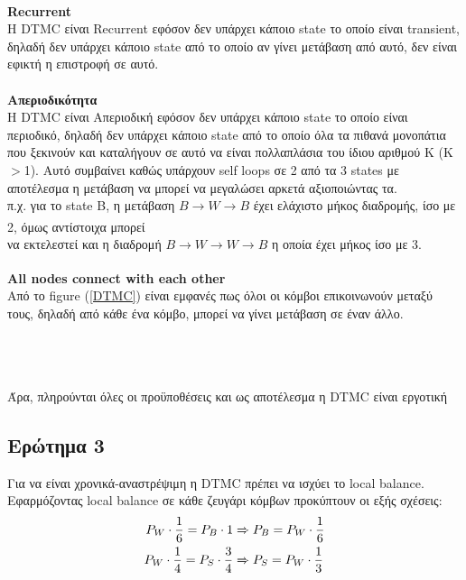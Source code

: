 \noindent\\
\textbf{Recurrent}\\
H DTMC είναι Recurrent εφόσον δεν υπάρχει κάποιο state το οποίο είναι transient, δηλαδή δεν υπάρχει κάποιο state από το οποίο αν γίνει μετάβαση από αυτό, δεν είναι εφικτή η επιστροφή σε αυτό.\\

\noindent\\
\textbf{Απεριοδικότητα}\\
Η DTMC είναι Απεριοδική εφόσον δεν υπάρχει κάποιο state το οποίο είναι περιοδικό, δηλαδή δεν υπάρχει κάποιο state από το οποίο όλα τα πιθανά μονοπάτια που ξεκινούν και καταλήγουν σε αυτό να είναι πολλαπλάσια του ίδιου αριθμού Κ (Κ$>$1). Αυτό συμβαίνει καθώς υπάρχουν self loops σε 2 από τα 3 states με αποτέλεσμα η μετάβαση να μπορεί να μεγαλώσει αρκετά αξιοποιώντας τα.\\

\noindent
π.χ. για το state Β, η μετάβαση $B \xrightarrow[]{} W \xrightarrow[]{} B$ έχει ελάχιστο μήκος διαδρομής, ίσο με 2, όμως αντίστοιχα μπορεί\\ \vspace{1cm} \qquad να εκτελεστεί και η διαδρομή $B \xrightarrow[]{} W \xrightarrow[]{} W \xrightarrow[]{} B$ η οποία έχει μήκος ίσο με 3.

\noindent
\textbf{All nodes connect with each other}\\
Από το figure (\ref{DTMC}) είναι εμφανές πως όλοι οι κόμβοι επικοινωνούν μεταξύ τους, δηλαδή από κάθε ένα κόμβο, μπορεί να γίνει μετάβαση σε έναν άλλο.


\noindent\\\\\\
Άρα, πληρούνται όλες οι προϋποθέσεις και ως αποτέλεσμα η DTMC είναι εργοτική

\clearpage
\subsection*{Ερώτημα 3}
\label{ex2q3}

Για να είναι χρονικά-αναστρέψιμη η DTMC πρέπει να ισχύει το local balance. Εφαρμόζοντας local balance σε κάθε ζευγάρι κόμβων προκύπτουν οι εξής σχέσεις:
\begin{align}
	P_W \cdot \frac{1}{6} = P_B \cdot 1 &\xRightarrow{} P_B = P_W \cdot \frac{1}{6} \label{pbw}\\
	P_W \cdot \frac{1}{4} = P_S \cdot \frac{3}{4} &\xRightarrow{} P_S = P_W \cdot \frac{1}{3} \label{psw}
\end{align}


